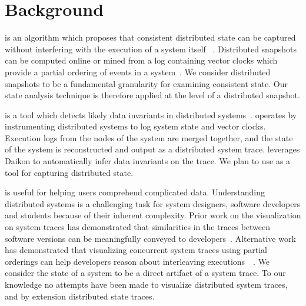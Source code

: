 \section{Background}
\label{sec:background}


 is an algorithm which
proposes that consistent distributed state can be captured without
interfering with the execution of a system itself
~\cite{dist_snapshots_Chandy1985}.  Distributed snapshots can be
computed online or mined from a log containing vector clocks which
provide a partial ordering of events in a
system~\cite{mattern_vector_clocks_1989}. We consider distributed
snapshots to be a fundamental granularity for examining consistent
state. Our state analysis technique is therefore applied at the level
of a distributed snapshot.

\noindent{\textbf{\dinv}} is a tool which detects likely data
invariants in distributed systems~\cite{dinv}. \dinv operates by
instrumenting distributed systems to log system state and vector
clocks.  Execution logs from the nodes of the system are merged
together, and the state of the system is reconstructed and output as a
distributed system trace. \dinv leverages Daikon to automatically
infer data invariants on the trace.  We plan to use \dinv as a tool
for capturing distributed state.

 is useful for helping users
comprehend complicated data.  Understanding distributed systems is a
challenging task for system designers, software developers and
students because of their inherent complexity.  Prior work on the
visualization on system traces has demonstrated that similarities in
the traces between software versions can be meaningfully conveyed to
developers~\cite{6613833}. Alternative work has demonstrated that
visualizing concurrent system traces using partial orderings can help
developers reason about interleaving
executions~\cite{6650534}~\cite{7272586}. We consider the state of a
system to be a direct artifact of a system trace. To our knowledge no
attempts have been made to visualize distributed system traces, and by
extension distributed state traces.


